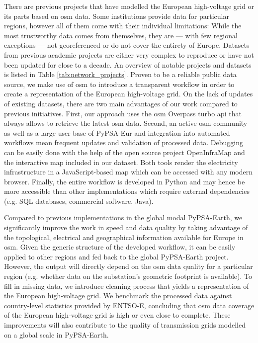 \documentclass[fleqn,10pt]{wlscirep}
\let\autocite\cite
\begin{document}
There are previous projects that have modelled the European high-voltage grid or its parts based on \gls{osm} data. Some institutions provide data for particular regions, however all of them come with their individual limitations: While the most trustworthy data comes from  themselves, they are --- with few regional exceptions \autocite{50hertzStaticGridModel2022} --- not georeferenced \autocite{jaoStaticGridModel2023} or do not cover the entirety of Europe. Datasets from previous academic projects \autocite{egererElectricitySectorData2014,hutcheonUpdatedValidatedPower2013,medjroubiOpenDataPower2017} are either very complex to reproduce or have not been updated for close to a decade. An overview of notable projects and datasets is listed in Table \ref{tab:network_projects}. Proven to be a reliable public data source, we make use of \acrshort{osm} to introduce a transparent workflow in order to create a representation of the European high-voltage grid. On the lack of updates of existing datasets, there are two main advantages of our work compared to previous initiatives. First, our approach uses the \acrshort{osm} Overpass turbo \gls{api}\autocite{raiferOverpassTurbo2024} that always allows to retrieve the latest \acrshort{osm} data. Second, an active \acrshort{osm} community as well as a large user base of PyPSA-Eur and integration into automated workflows mean frequent updates and validation of processed data. Debugging can be easily done with the help of the open source project OpenInfraMap \autocite{garrettOpenInfrastructureMap2024} and the interactive map included in our dataset. Both tools render the electricity infrastructure in a JavaScript-based map which can be accessed with any modern browser. Finally, the entire workflow is developed in Python and may hence be more accessible than other implementations which require external dependencies (e.g. SQL databases, commercial software, Java).\autocite{wiegmansGridKitExtractENTSOE2016}

Compared to previous implementations in the global modal PyPSA-Earth,\autocite{parzenPyPSAEarthNewGlobal2023} we significantly improve the work in speed and data quality by taking advantage of the topological, electrical and geographical information available for Europe in \gls{osm}. Given the generic structure of the developed workflow, it can be easily applied to other regions and fed back to the global PyPSA-Earth project. However, the output will directly depend on the \acrshort{osm} data quality for a particular region (e.g. whether data on the substation's geometric footprint is available). To fill in missing data, we introduce cleaning process that yields a representation of the European high-voltage grid. 
We benchmark the processed data against country-level statistics provided by ENTSO-E, concluding that \acrshort{osm} data coverage of the European high-voltage grid is high or even close to complete. These improvements will also contribute to the quality of transmission grids modelled on a global scale in PyPSA-Earth. 
\end{document}
